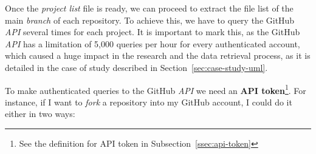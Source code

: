 \documentclass[a4paper, 12pt]{book}
\begin{document}
Once the \emph{project list} file is ready, we can proceed to extract the file list of the main \textit{branch} of each
repository. To achieve this, we have to query the GitHub \textit{API} several times for each project.
It is important to mark this, as the GitHub \textit{API} has a limitation of
5,000 queries per hour for every authenticated account, which caused a huge impact in the research and the data retrieval
process, as it is detailed in the case of study described in Section~\ref{sec:case-study-uml}.

To make authenticated queries to the GitHub \textit{API} we need an \textbf{API token}\footnote{See the definition for API token in Subsection~\ref{ssec:api-token}}.
For instance, if I want to \textit{fork} a repository into my GitHub account, I could do it either in two ways:
\end{document}
